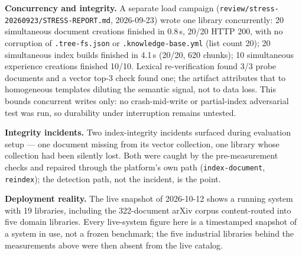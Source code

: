 \textbf{Concurrency and integrity.}
A separate load campaign (\texttt{review/stress-20260923/STRESS-REPORT.md},
2026-09-23) wrote one library concurrently: 20 simultaneous document
creations finished in 0.8\,s, 20/20 HTTP 200, with no corruption of
\texttt{.tree-fs.json} or \texttt{.knowledge-base.yml} (list count 20);
20 simultaneous index builds finished in 4.1\,s (20/20, 620 chunks); 10
simultaneous experience creations finished 10/10. Lexical re-verification
found 3/3 probe documents and a vector top-3 check found one; the artifact
attributes that to homogeneous templates diluting the semantic signal, not
to data loss. This bounds concurrent writes only: no crash-mid-write or
partial-index adversarial test was run, so durability under interruption
remains untested.

\textbf{Integrity incidents.}
Two index-integrity incidents surfaced during evaluation setup --- one
document missing from its vector collection, one library whose collection
had been silently lost. Both were caught by the pre-measurement checks and
repaired through the platform's own path (\texttt{index-document},
\texttt{reindex}); the detection path, not the incident, is the point.

\textbf{Deployment reality.}
The live snapshot of 2026-10-12 shows a running system with 19 libraries,
including the 322-document arXiv corpus content-routed into five domain
libraries. Every live-system figure here is a timestamped snapshot of a
system in use, not a frozen benchmark; the five industrial libraries
behind the measurements above were then absent from the live catalog.
